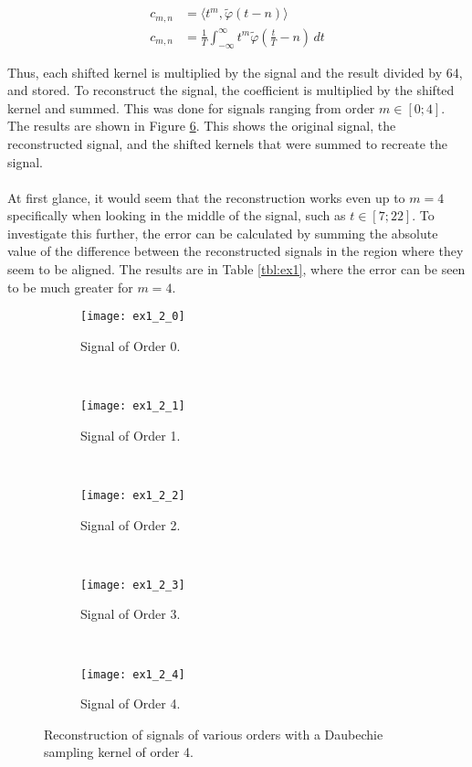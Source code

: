 \documentclass[11pt,a4paper]{report}
\begin{document}
\begin{align}
    c_{m,n} &= \langle t^m, \tilde{\varphi}(t - n)\rangle\label{eq:coefficient}\\
    c_{m,n} &= \frac{1}{T} \int_{-\infty}^{\infty} t^m \tilde{\varphi} \left( \frac{t}{T} -n \right) \,dt \label{eq:constant}
\end{align}

Thus, each shifted kernel is multiplied by the signal and the result divided by 64, and stored. To reconstruct the signal, the coefficient is multiplied by the shifted kernel and summed. This was done for signals ranging from order $m \in [0; 4]$. The results are shown in Figure \ref{fig:ex1_2}. This shows the original signal, the reconstructed signal, and the shifted kernels that were summed to recreate the signal.
\\\\
At first glance, it would seem that the reconstruction works even up to $m=4$ specifically when looking in the middle of the signal, such as $t \in [7; 22]$. To investigate this further, the error can be calculated by summing the absolute value of the difference between the reconstructed signals in the region where they seem to be aligned. The results are in Table \ref{tbl:ex1}, where the error can be seen to be much greater for $m=4$.

\begin{figure}[!ht]
    \captionsetup[subfigure]{position=b}
    \centering
    \begin{subfigure}{0.49\textwidth}
        \texttt{[image: ex1\_2\_0]}
        \caption{Signal of Order 0.}
        \label{fig:ex1_2_0}
    \end{subfigure}
    ~
    \begin{subfigure}{0.49\textwidth}
        \texttt{[image: ex1\_2\_1]}
        \caption{Signal of Order 1.}
        \label{fig:ex1_2_1}
    \end{subfigure}
    \\
    \begin{subfigure}{0.49\textwidth}
        \texttt{[image: ex1\_2\_2]}
        \caption{Signal of Order 2.}
        \label{fig:ex1_2_2}
    \end{subfigure}
    ~
    \begin{subfigure}{0.49\textwidth}
        \texttt{[image: ex1\_2\_3]}
        \caption{Signal of Order 3.}
        \label{fig:ex1_2_3}
    \end{subfigure}
    \\
    \begin{subfigure}{0.75\textwidth}
        \texttt{[image: ex1\_2\_4]}
        \caption{Signal of Order 4.}
        \label{fig:ex1_2_4}
    \end{subfigure}

    \caption{Reconstruction of signals of various orders with a Daubechie sampling kernel of order 4.}
    \label{fig:ex1_2}
\end{figure}
\end{document}
